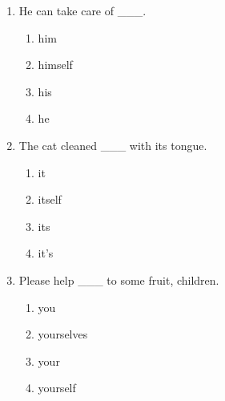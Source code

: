 \documentclass[11pt,a4paper]{ctexart}
\begin{document}
\begin{enumerate}[leftmargin=*,itemsep=4pt]
\begin{enumerate}[label=\Alph*.,leftmargin=2em,itemsep=1pt,topsep=2pt]
\item they
\end{enumerate}
\item He can take care of \_\_\_.
\begin{enumerate}[label=\Alph*.,leftmargin=2em,itemsep=1pt,topsep=2pt]
\item him
\item himself
\item his
\item he
\end{enumerate}
\item The cat cleaned \_\_\_ with its tongue.
\begin{enumerate}[label=\Alph*.,leftmargin=2em,itemsep=1pt,topsep=2pt]
\item it
\item itself
\item its
\item it’s
\end{enumerate}
\item Please help \_\_\_ to some fruit, children.
\begin{enumerate}[label=\Alph*.,leftmargin=2em,itemsep=1pt,topsep=2pt]
\item you
\item yourselves
\item your
\item yourself
\end{enumerate}
\end{enumerate}
\end{document}
